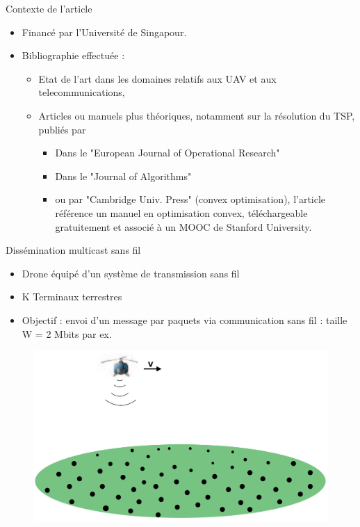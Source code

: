 \begin{frame}{Contexte de l'article}
\begin{itemize}
	\item Financé par l'Université de Singapour.

	\item Bibliographie effectuée : 
	\begin{itemize}
		\item Etat de l'art dans les domaines relatifs aux UAV et aux telecommunications, 
		\item Articles ou manuels plus théoriques, notamment sur la résolution du TSP, publiés par 
 			\begin{itemize}
 				\item  Dans le "European Journal of Operational Research"
 				\item  Dans le "Journal of Algorithms"
 				\item  ou par "Cambridge Univ. Press" (convex optimisation), l'article référence un manuel
 				en optimisation convex, téléchargeable gratuitement et associé à un MOOC de Stanford University.
 			\end{itemize}
	\end{itemize}


\end{itemize}
\end{frame}
 
\begin{frame}{Dissémination multicast sans fil}
\begin{itemize}
	\item Drone  équipé d'un système de transmission  sans fil
	\item K Terminaux terrestres
	\item Objectif : envoi d'un message par paquets via communication sans fil : taille W = 2 Mbits par ex.  
\end{itemize}
%


\begin{figure}
	\centering
	\includegraphics[width=0.6\linewidth]{images/multicast}
	\caption{}
	\label{fig:multicast}
\end{figure}

\end{frame}

